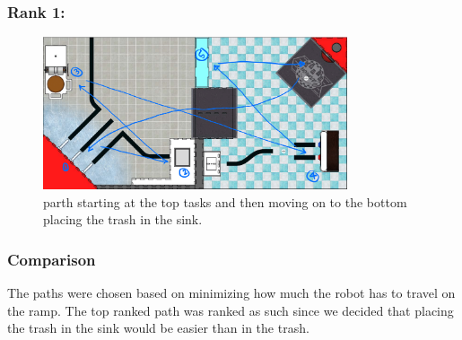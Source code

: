 \documentclass[12pt]{extarticle}
\begin{document}
\subsubsection*{Rank 1:}
\begin{figure}[H]
    \centering
    \includegraphics[width=0.8\textwidth]{R01-1_ Individual Brainstorming-1.png}
    \caption{\centering parth starting at the top tasks and then moving on to the bottom placing the trash in the sink.}
    \label{fig:path1}
\end{figure}

\newpage

\subsubsection*{Comparison}
The paths were chosen based on minimizing how much the robot has to travel on the ramp.
 The top ranked path was ranked as such since we decided that placing the trash in the sink would be easier than in the trash.
\end{document}
